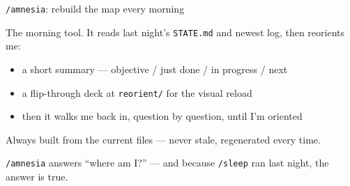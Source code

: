 \documentclass[aspectratio=169,11pt]{beamer}
\begin{document}
  \begin{frame}{\texttt{/amnesia}: rebuild the map every morning}
  
  The morning tool. It reads last night's \texttt{STATE.md} and newest log, then reorients me:
  
  \begin{itemize}\setlength\itemsep{0.3em}
      \item a short summary --- objective / just done / in progress / next
      \item a flip-through deck at \texttt{reorient/} for the visual reload
      \item then it walks me back in, question by question, until I'm oriented
  \end{itemize}

  \vspace{0.2cm}
  
  Always built from the current files --- never stale, regenerated every time.
  
  \vspace{0.3cm}
  
  \alert{\texttt{/amnesia} answers ``where am I?'' --- and because \texttt{/sleep} ran last night, the answer is true.}
  
  \end{frame}
  
  
\end{document}
